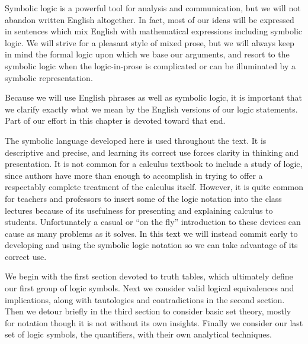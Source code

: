 Symbolic logic is a powerful tool for analysis and communication,
but we will not abandon written English altogether.  In fact, most
of our ideas will be expressed in sentences which mix 
English with mathematical expressions including symbolic logic.
We will strive for a pleasant style of mixed prose, but we
will always keep in mind the formal logic upon which we base our arguments,
and resort to the symbolic logic when the logic-in-prose is complicated
or can be illuminated by a symbolic representation. 


Because we will use English phrases as well as symbolic logic,
it is important that we clarify exactly what we mean by
the English versions of our logic statements.
Part of our effort in this chapter is devoted toward that end.





The symbolic language developed here is used throughout the text. 
It is descriptive and precise, and 
learning its correct use forces clarity in thinking and 
presentation.  It is not common for a calculus textbook to 
include a study of logic, since authors have more than
enough to accomplish in trying to offer a respectably complete
treatment of the calculus itself.  However, it is quite
common for teachers and professors to insert some of the logic
notation  into the class lectures because of its
usefulness for presenting and explaining calculus to students.
Unfortunately a casual or ``on the fly'' introduction to these devices
can cause as many problems as it solves.  %
In this text
we will instead commit early to developing and
using the symbolic logic notation so we can take advantage
of its correct use.

We begin with the first section devoted to truth tables, which 
ultimately define our first group of logic symbols.  Next we 
consider valid logical equivalences and implications, along
with tautologies and contradictions in the second section.
Then we detour briefly in the third section
to consider basic set theory, mostly for
notation though it is not without its own insights.  
Finally we consider our last set of logic symbols,
the quantifiers, with their own analytical techniques.

